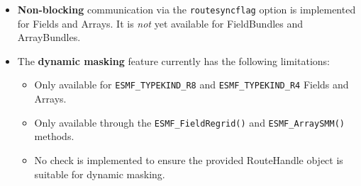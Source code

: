 
\begin{itemize}

\item {\bf Non-blocking} communication via the {\tt routesyncflag} option is implemented for Fields and Arrays. It is {\em not} yet available for FieldBundles and ArrayBundles.

\item The {\bf dynamic masking} feature currently has the following limitations:

\begin{itemize}

\item Only available for {\tt ESMF\_TYPEKIND\_R8} and {\tt ESMF\_TYPEKIND\_R4} Fields and Arrays.

\item Only available through the {\tt ESMF\_FieldRegrid()} and {\tt ESMF\_ArraySMM()} methods.

\item No check is implemented to ensure the provided RouteHandle object is suitable for dynamic masking.

\end{itemize}


\end{itemize}
